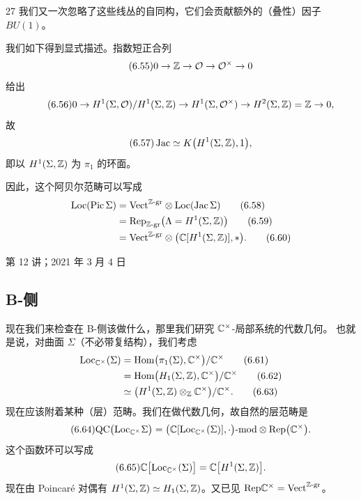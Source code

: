 \begin{srcrem}{27}
我们又一次忽略了这些线丛的自同构，它们会贡献额外的（叠性）因子 $BU(1)$。
\end{srcrem}

我们如下得到显式描述。指数短正合列
\begin{equation}\tag{6.55}\label{eq:6.55}
0\to\mathbb{Z}\to\mathcal{O}\to\mathcal{O}^{\times}\to 0
\end{equation}
给出
\begin{equation}\tag{6.56}\label{eq:6.56}
0\to H^1(\Sigma,\mathcal{O})/H^1(\Sigma,\mathbb{Z})\to H^1(\Sigma,\mathcal{O}^{\times})
\to H^2(\Sigma,\mathbb{Z})=\mathbb{Z}\to 0,
\end{equation}
故
\begin{equation}\tag{6.57}\label{eq:6.57}
\operatorname{Jac}\simeq K\bigl(H^1(\Sigma,\mathbb{Z}),1\bigr),
\end{equation}
即以 $H^1(\Sigma,\mathbb{Z})$ 为 $\pi_1$ 的环面。

因此，这个阿贝尔范畴可以写成
\begin{align}
\mathrm{Loc}(\operatorname{Pic}\Sigma)
&=\mathrm{Vect}^{\mathbb{Z}\text{-gr}}\otimes\mathrm{Loc}(\operatorname{Jac}\Sigma)\tag{6.58}\label{eq:6.58}\\
&=\mathrm{Rep}_{\mathbb{Z}\text{-gr}}\bigl(\Lambda=H^1(\Sigma,\mathbb{Z})\bigr)\tag{6.59}\label{eq:6.59}\\
&=\mathrm{Vect}^{\mathbb{Z}\text{-gr}}\otimes\bigl(\mathbb{C}[H^1(\Sigma,\mathbb{Z})],*\bigr).\tag{6.60}\label{eq:6.60}
\end{align}

\begin{flushright}
\small 第 12 讲；2021 年 3 月 4 日
\end{flushright}

\subsection{B-侧}

现在我们来检查在 B-侧该做什么，那里我们研究 $\mathbb{C}^{\times}$-局部系统的代数几何。
也就是说，对曲面 $\Sigma$（不必带复结构），我们考虑
\begin{align}
\mathrm{Loc}_{\mathbb{C}^{\times}}(\Sigma)
&=\mathrm{Hom}\bigl(\pi_1(\Sigma),\mathbb{C}^{\times}\bigr)/\mathbb{C}^{\times}\tag{6.61}\label{eq:6.61}\\
&=\mathrm{Hom}\bigl(H_1(\Sigma,\mathbb{Z}),\mathbb{C}^{\times}\bigr)/\mathbb{C}^{\times}\tag{6.62}\label{eq:6.62}\\
&\simeq\bigl(H^1(\Sigma,\mathbb{Z})\otimes_{\mathbb{Z}}\mathbb{C}^{\times}\bigr)/\mathbb{C}^{\times}.\tag{6.63}\label{eq:6.63}
\end{align}
现在应该附着某种（层）范畴。我们在做代数几何，故自然的层范畴是
\begin{equation}\tag{6.64}\label{eq:6.64}
\mathrm{QC}\bigl(\mathrm{Loc}_{\mathbb{C}^{\times}}\Sigma\bigr)
=\bigl(\mathbb{C}[\mathrm{Loc}_{\mathbb{C}^{\times}}(\Sigma)],\cdot\bigr)\text{-mod}
\otimes\mathrm{Rep}\bigl(\mathbb{C}^{\times}\bigr).
\end{equation}
这个函数环可以写成
\begin{equation}\tag{6.65}\label{eq:6.65}
\mathbb{C}\bigl[\mathrm{Loc}_{\mathbb{C}^{\times}}(\Sigma)\bigr]=\mathbb{C}\bigl[H^1(\Sigma,\mathbb{Z})\bigr].
\end{equation}
现在由 Poincaré 对偶有 $H^1(\Sigma,\mathbb{Z})\simeq H_1(\Sigma,\mathbb{Z})$。又已见
$\mathrm{Rep}\mathbb{C}^{\times}=\mathrm{Vect}^{\mathbb{Z}\text{-gr}}$。

